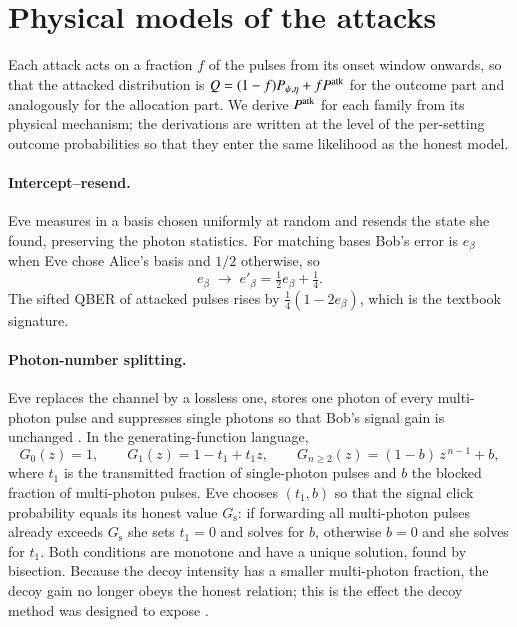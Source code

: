 \section{Physical models of the attacks}\label{sec:attacks}

Each attack acts on a fraction $f$ of the pulses from its onset window onwards, so that the attacked distribution is $Q=(1-f)P_{\psi,\eta}+fP^{\rm atk}$ for the outcome part and analogously for the allocation part. We derive $P^{\rm atk}$ for each family from its physical mechanism; the derivations are written at the level of the per-setting outcome probabilities so that they enter the same likelihood as the honest model.

\paragraph{Intercept--resend.} Eve measures in a basis chosen uniformly at random and resends the state she found, preserving the photon statistics. For matching bases Bob's error is $e_\beta$ when Eve chose Alice's basis and $1/2$ otherwise, so
\begin{equation}
e_\beta \;\to\; e'_\beta = \tfrac12 e_\beta + \tfrac14. \label{eq:ir}
\end{equation}
The sifted QBER of attacked pulses rises by $\tfrac14(1-2e_\beta)$, which is the textbook signature.

\paragraph{Photon-number splitting.} Eve replaces the channel by a lossless one, stores one photon of every multi-photon pulse and suppresses single photons so that Bob's signal gain is unchanged \cite{Brassard2000}. In the generating-function language,
\begin{equation}
G_0(z)=1,\qquad G_1(z)=1-t_1+t_1z,\qquad G_{n\ge2}(z)=(1-b)\,z^{\,n-1}+b, \label{eq:pns}
\end{equation}
where $t_1$ is the transmitted fraction of single-photon pulses and $b$ the blocked fraction of multi-photon pulses. Eve chooses $(t_1,b)$ so that the signal click probability equals its honest value $G_\mathrm{s}$: if forwarding all multi-photon pulses already exceeds $G_\mathrm{s}$ she sets $t_1=0$ and solves for $b$, otherwise $b=0$ and she solves for $t_1$. Both conditions are monotone and have a unique solution, found by bisection. Because the decoy intensity has a smaller multi-photon fraction, the decoy gain no longer obeys the honest relation; this is the effect the decoy method was designed to expose \cite{Hwang2003,LoMaChen2005}.

